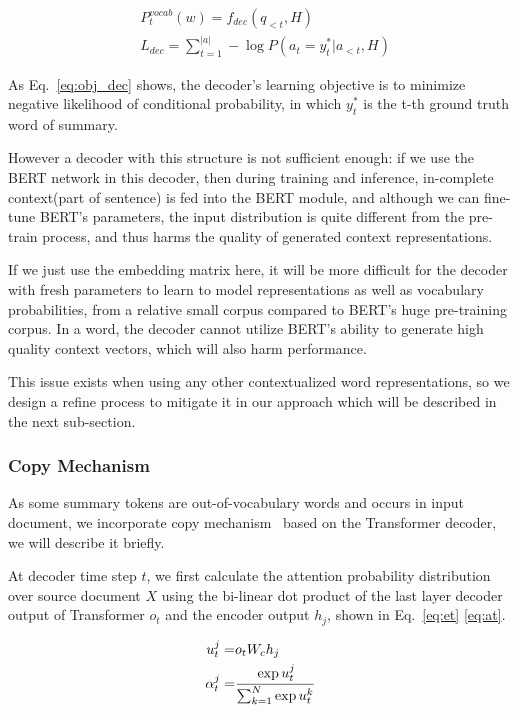 \documentclass{article}
\begin{document}
\begin{eqnarray}
    &P^{vocab}_t(w) = f_{dec}(q_{<t}, H) \label{eq:p_vocab} \\
    &L_{dec} = \sum_{t=1}^{|a|} -\log P(a_t = y_t^*|a_{< t}, H) \label{eq:obj_dec}
\end{eqnarray}

As Eq.~\eqref{eq:obj_dec} shows, the decoder's learning objective is to minimize negative likelihood of conditional probability, in which $y_t^*$ is the t-th ground truth word of summary. 

However a decoder with this structure is not sufficient enough: if we use the BERT network in this decoder, then during training and inference, in-complete context(part of sentence) is fed into the BERT module, and although we can fine-tune BERT's parameters, the input distribution is quite different from the pre-train process, and thus harms the quality of generated context representations.

If we just use the embedding matrix here, 
it will be more difficult for the decoder with fresh parameters to learn to model representations as well as vocabulary probabilities, from a relative small corpus compared to BERT's huge pre-training corpus. In a word, the decoder cannot utilize BERT's ability to generate high quality context vectors, which will also harm performance.

This issue exists when using any other contextualized word representations, so we design a refine process to mitigate it in our approach which will be described in the next sub-section.

\subsubsection{Copy Mechanism}

As some summary tokens are out-of-vocabulary words and occurs in input document, we incorporate copy mechanism~\cite{Gu2015} based on the Transformer decoder, we will describe it briefly.

At decoder time step $t$, we first calculate the attention probability distribution over source document $X$ using the bi-linear dot product of the last layer decoder output of Transformer $o_t$ and the encoder output $h_j$, shown in Eq.~\eqref{eq:et} \eqref{eq:at}. 

\begin{eqnarray}
u_t^j =& o_t W_c h_j \label{eq:et}\\
\alpha_t^j =& \cfrac {\exp{u_t^j}}   {\sum_{k=1}^N\exp{u_t^k}} \label{eq:at} 
\end{eqnarray}
\end{document}
